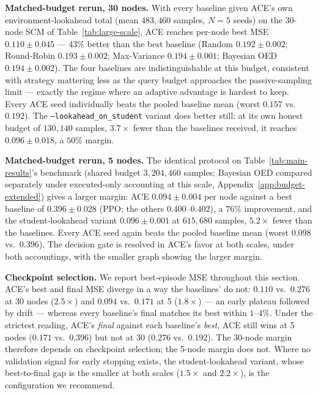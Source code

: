 \documentclass[twoside]{article}
\theoremstyle{plain}
\theoremstyle{definition}
\theoremstyle{remark}
\begin{document}
\textbf{Matched-budget rerun, 30 nodes.} With every baseline given ACE's own environment-lookahead total (mean $483{,}460$ samples, $N{=}5$ seeds) on the 30-node SCM of Table~\ref{tab:large-scale}, ACE reaches per-node best MSE $0.110\pm0.045$ --- $43\%$ better than the best baseline (Random $0.192\pm0.002$; Round-Robin $0.193\pm0.002$; Max-Variance $0.194\pm0.001$; Bayesian OED $0.194\pm0.002$). The four baselines are indistinguishable at this budget, consistent with strategy mattering less as the query budget approaches the passive-sampling limit --- exactly the regime where an adaptive advantage is hardest to keep. Every ACE seed individually beats the pooled baseline mean (worst $0.157$ vs.\ $0.192$). The \texttt{--lookahead\_on\_student} variant does better still: at its own honest budget of $130{,}140$ samples, $3.7\times$ fewer than the baselines received, it reaches $0.096\pm0.018$, a $50\%$ margin.

\textbf{Matched-budget rerun, 5 nodes.} The identical protocol on Table~\ref{tab:main-results}'s benchmark (shared budget $3{,}204{,}460$ samples; Bayesian OED compared separately under executed-only accounting at this scale, Appendix~\ref{app:budget-extended}) gives a larger margin: ACE $0.094\pm0.004$ per node against a best baseline of $0.396\pm0.028$ (PPO; the others $0.400$--$0.402$), a $76\%$ improvement, and the student-lookahead variant $0.096\pm0.001$ at $615{,}680$ samples, $5.2\times$ fewer than the baselines. Every ACE seed again beats the pooled baseline mean (worst $0.098$ vs.\ $0.396$). The decision gate is resolved in ACE's favor at both scales, under both accountings, with the smaller graph showing the larger margin.

\textbf{Checkpoint selection.} We report best-episode MSE throughout this section. ACE's best and final MSE diverge in a way the baselines' do not: $0.110$ vs.\ $0.276$ at 30 nodes ($2.5\times$) and $0.094$ vs.\ $0.171$ at 5 ($1.8\times$) --- an early plateau followed by drift --- whereas every baseline's final matches its best within $1$--$4\%$. Under the strictest reading, ACE's \emph{final} against each baseline's \emph{best}, ACE still wins at 5 nodes ($0.171$ vs.\ $0.396$) but not at 30 ($0.276$ vs.\ $0.192$). The 30-node margin therefore depends on checkpoint selection; the 5-node margin does not. Where no validation signal for early stopping exists, the student-lookahead variant, whose best-to-final gap is the smaller at both scales ($1.5\times$ and $2.2\times$), is the configuration we recommend.
\end{document}
